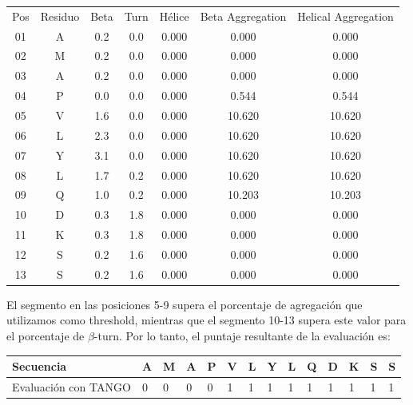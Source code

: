 \vspace{0.3cm}
\begin{tabular}{ccccccc}
Pos & Residuo & Beta & Turn & 	Hélice & Beta Aggregation & Helical Aggregation\\
01 &          A & 0.2 & 0.0 &  0.000  & 0.000 &  0.000\\
02 &          M  &     0.2 &    0.0 &  0.000 &  0.000 &  0.000\\
03 &          A &      0.2  &      0.0 &  0.000 &  0.000  & 0.000\\
04  &         P &      0.0   &     0.0 &  0.000 &  0.544  & 0.544\\
05  &         V &      1.6   &     0.0 &  0.000 &  10.620 & 10.620\\
06   &        L &      2.3   &     0.0 &  0.000 &  10.620 & 10.620\\
07      &     Y &      3.1   &     0.0 &  0.000 &  10.620 & 10.620\\
08        &   L &      1.7   &     0.2 &  0.000 &  10.620 & 10.620\\
09         &  Q &      1.0   &     0.2 &  0.000 &  10.203 & 10.203\\
10   &        D &      0.3    &    1.8 &  0.000 &  0.000 &  0.000\\
11  &         K &      0.3   &     1.8 &  0.000 &  0.000 &  0.000\\
12  &         S &      0.2   &     1.6 &  0.000 &  0.000 &  0.000\\
13  &         S  &     0.2  &      1.6 &  0.000 &  0.000 &  0.000\\
\end{tabular}

\vspace{0.5cm}
El segmento en las posiciones 5-9 supera el porcentaje de agregación que utilizamos como threshold, mientras que el segmento 10-13 supera este valor para el porcentaje de $\beta$-turn.
Por lo tanto, el puntaje resultante de la evaluación es:

\vspace{0.5cm}
\noindent
\begin{tabular}{llllllllllllll} 
\hline      		
Secuencia & \textbf{A} & \textbf{M} & \textbf{A} & \textbf{P} & \textbf{V} & \textbf{L} & \textbf{Y} & \textbf{L} & \textbf{Q} & \textbf{D} & \textbf{K} & \textbf{S} & \textbf{S} \\ \hline
Evaluación con TANGO & 0 & 0 & 0 & 0 & 1 & 1 & 1 & 1 & 1 & 1 & 1 & 1 & 1 \\ \hline
\end{tabular}





